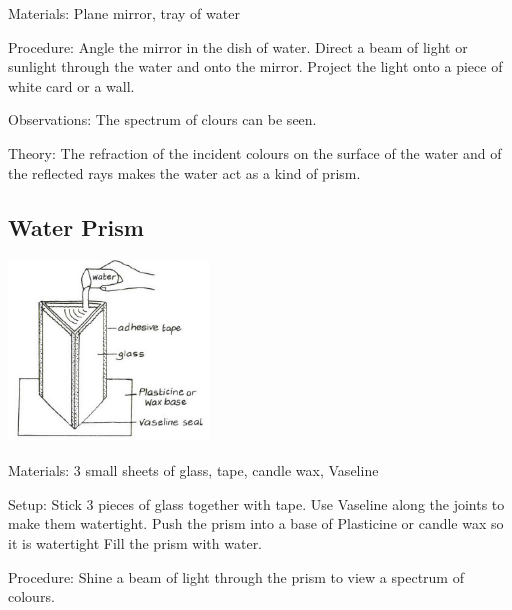 \begin{multicols}{2}
\begin{description*}
\item[Materials:]{Plane mirror, tray of water}
\item[Procedure:]{Angle the mirror in the dish of water. Direct a beam of light or sunlight through the water and onto the mirror. Project the light onto a piece of white card or a wall.}
\item[Observations:]{The spectrum of clours can be seen.}
\item[Theory:]{The refraction of the incident colours on the surface of the water and of the reflected rays makes the water act as a kind of prism.}
\end{description*}

\subsection{Water Prism}

\begin{center}
\includegraphics[width=0.4\textwidth]{./img/vso/water-prism.png}
\end{center}

\begin{description*}
\item[Materials:]{3 small sheets of glass, tape, candle wax, Vaseline}
\item[Setup:]{Stick 3 pieces of glass together with tape. Use Vaseline along the joints to make them watertight. Push the prism into a base of Plasticine or candle wax so it is watertight Fill the prism with water.}
\item[Procedure:]{Shine a beam of light through the prism to view a spectrum of colours.}
\end{description*}


\end{multicols}
